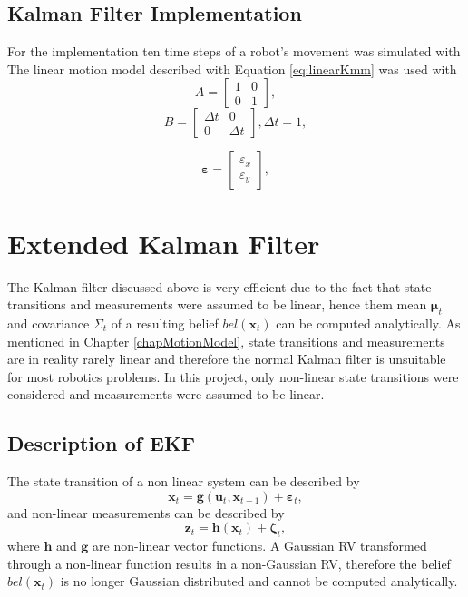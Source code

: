\documentclass[12pt,oneside,openany,a4paper, %
afrikaans,english,
]{memoir}
\numberwithin{equation}{chapter}
\begin{document}
\subsection{Kalman Filter Implementation}
For the implementation ten time steps of a robot's movement was simulated with 
The linear motion model described with Equation \ref{eq:linearKmm} was used with
\begin{equation}
A =
\begin{bmatrix}
1 & 0\\
0 & 1
\end{bmatrix},
\end{equation}
\begin{equation}
B = \begin{bmatrix}
\Delta t & 0\\
0 & \Delta t
\end{bmatrix}, \Delta t = 1,
\end{equation}

\begin{equation}
\bm{\varepsilon} =
\begin{bmatrix}
\varepsilon_x\\
\varepsilon_y
\end{bmatrix},
\end{equation}

\section{Extended Kalman Filter}
The Kalman filter discussed above is very efficient due to the fact that state transitions and measurements were assumed to be linear, hence them mean $\bm{\mu}_t$ and covariance $\Sigma_t$ of a resulting belief $bel(\bm{x}_t)$ can be computed analytically.
As mentioned in Chapter \ref{chapMotionModel}, state transitions and measurements are in reality rarely linear and therefore the normal Kalman filter is unsuitable for most robotics problems. In this project, only non-linear state transitions were considered and measurements were assumed to be linear.

\subsection{Description of EKF}
The state transition of a non linear system can be described by
\begin{equation}
\bm{x}_t = \bm{g}(\bm{u}_t, \bm{x}_{t-1}) + \bm{\varepsilon}_t,
\end{equation}
and non-linear measurements can be described by
\begin{equation}
\bm{z}_t = \bm{h}(\bm{x}_t) + \bm{\zeta}_t,
\end{equation}
where $\bm{h}$ and $\bm{g}$ are non-linear vector functions. A Gaussian RV transformed through a non-linear function results in a non-Gaussian RV, therefore the belief $bel(\bm{x}_t)$ is no longer Gaussian distributed and cannot be computed analytically.
\end{document}
